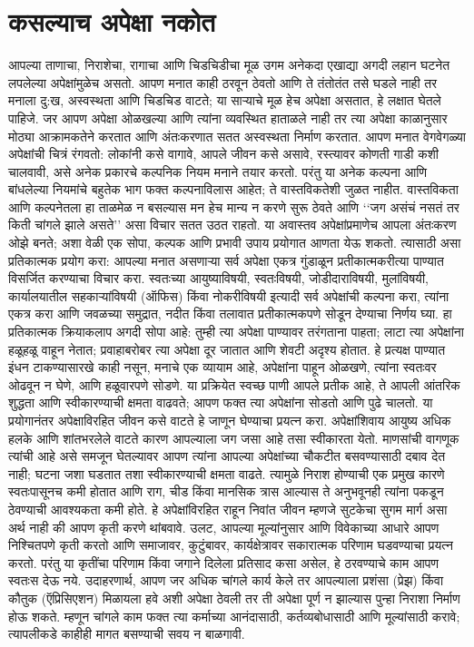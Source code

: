 \chapter{कसल्याच अपेक्षा नकोत }
आपल्या ताणाचा, निराशेचा, रागाचा आणि चिडचिडीचा मूळ उगम अनेकदा एखाद्या अगदी लहान घटनेत लपलेल्या अपेक्षांमुळेच असतो. आपण मनात काही ठरवून ठेवतो आणि ते तंतोतंत तसे घडले नाही तर मनाला दु:ख, अस्वस्थता आणि चिडचिड वाटते; या साऱ्याचे मूळ हेच अपेक्षा असतात, हे लक्षात घेतले पाहिजे. जर आपण अपेक्षा ओळखल्या आणि त्यांना व्यवस्थित हाताळले नाही तर त्या अपेक्षा काळानुसार मोठ्या आक्रामकतेने करतात आणि अंतःकरणात सतत अस्वस्थता निर्माण करतात.
आपण मनात वेगवेगळ्या अपेक्षांची चित्रं रंगवतो: लोकांनी कसे वागावे, आपले जीवन कसे असावे, रस्त्यावर कोणती गाडी कशी चालवावी, असे अनेक प्रकारचे कल्पनिक नियम मनाने तयार करतो. परंतु या अनेक कल्पना आणि बांधलेल्या नियमांचे बहुतेक भाग फक्त कल्पनाविलास आहेत; ते वास्तविकतेशी जुळत नाहीत. वास्तविकता आणि कल्पनेतला हा ताळमेळ न बसल्यास मन हेच मान्य न करणे सुरू ठेवते आणि ‘‘जग असंचं नसतं तर किती चांगले झाले असते’’ असा विचार सतत उठत राहतो.
या अवास्तव अपेक्षांप्रमाणेच आपला अंतःकरण ओझे बनते; अशा वेळी एक सोपा, कल्पक आणि प्रभावी उपाय प्रयोगात आणता येऊ शकतो. त्यासाठी असा प्रतिकात्मक प्रयोग करा: आपल्या मनात असणाऱ्या सर्व अपेक्षा एकत्र गुंडाळून प्रतीकात्मकरीत्या पाण्यात विसर्जित करण्याचा विचार करा. स्वतःच्या आयुष्याविषयी, स्वतःविषयी, जोडीदाराविषयी, मुलांविषयी, कार्यालयातील सहकाऱ्यांविषयी (ऑफिस) किंवा नोकरीविषयी इत्यादी सर्व अपेक्षांची कल्पना करा, त्यांना एकत्र करा आणि जवळच्या समुद्रात, नदीत किंवा तलावात प्रतीकात्मकपणे सोडून देण्याचा निर्णय घ्या.
हा प्रतिकात्मक क्रियाकलाप अगदी सोपा आहे: तुम्ही त्या अपेक्षा पाण्यावर तरंगताना पाहता; लाटा त्या अपेक्षांना हळूहळू वाहून नेतात; प्रवाहाबरोबर त्या अपेक्षा दूर जातात आणि शेवटी अदृश्य होतात. हे प्रत्यक्ष पाण्यात इंधन टाकण्यासारखे काही नसून, मनाचे एक व्यायाम आहे,  अपेक्षांना पाहून ओळखणे, त्यांना स्वतःवर ओढवून न घेणे, आणि हळूवारपणे सोडणे. या प्रक्रियेत स्वच्छ पाणी आपले प्रतीक आहे,  ते आपली आंतरिक शुद्धता आणि स्वीकारण्याची क्षमता वाढवते; आपण फक्त त्या अपेक्षांना सोडतो आणि पुढे चालतो.
या प्रयोगानंतर अपेक्षाविरहित जीवन कसे वाटते हे जाणून घेण्याचा प्रयत्न करा. अपेक्षांशिवाय आयुष्य अधिक हलके आणि शांतभरलेले वाटते कारण आपल्याला जग जसा आहे तसा स्वीकारता येतो. माणसांची वागणूक त्यांची आहे असे समजून घेतल्यावर आपण त्यांना आपल्या अपेक्षांच्या चौकटीत बसवण्यासाठी दबाव देत नाही; घटना जशा घडतात तशा स्वीकारण्याची क्षमता वाढते. त्यामुळे निराश होण्याची एक प्रमुख कारणे स्वतःपासूनच कमी होतात आणि राग, चीड किंवा मानसिक त्रास आल्यास ते अनुभवूनही त्यांना पकडून ठेवण्याची आवश्यकता कमी होते.
हे अपेक्षांविरहित राहून निवांत जीवन म्हणजे सुटकेचा सुगम मार्ग असा अर्थ नाही की आपण कृती करणे थांबवावे. उलट, आपल्या मूल्यांनुसार आणि विवेकाच्या आधारे आपण निश्चितपणे कृती करतो आणि समाजावर, कुटुंबावर, कार्यक्षेत्रावर सकारात्मक परिणाम घडवण्याचा प्रयत्न करतो. परंतु या कृतींचा परिणाम किंवा जगाने दिलेला प्रतिसाद कसा असेल, हे ठरवण्याचे काम आपण स्वतःस देऊ नये. उदाहरणार्थ, आपण जर अधिक चांगले कार्य केले तर आपल्याला प्रशंसा (प्रेझ) किंवा कौतुक (ऍप्रिसिएशन) मिळायला हवे अशी अपेक्षा ठेवली तर ती अपेक्षा पूर्ण न झाल्यास पुन्हा निराशा निर्माण होऊ शकते. म्हणून चांगले काम फक्त त्या कर्माच्या आनंदासाठी, कर्तव्यबोधासाठी आणि मूल्यांसाठी करावे; त्यापलीकडे काहीही मागत बसण्याची सवय न बाळगावी.
